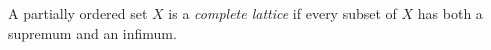 A partially ordered set $X$ is a \textit{complete lattice} if every subset of $X$ has both a supremum and an infimum.
